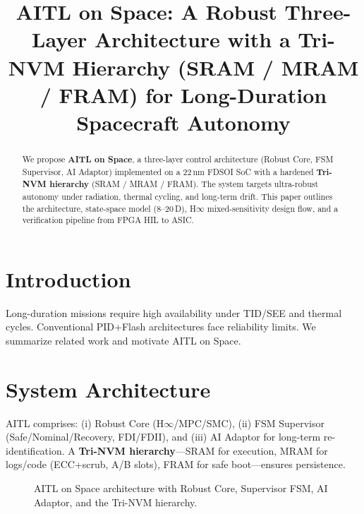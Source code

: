 \documentclass[conference]{IEEEtran}
\title{AITL on Space: A Robust Three-Layer Architecture with a Tri-NVM Hierarchy (SRAM / MRAM / FRAM) for Long-Duration Spacecraft Autonomy}
\author{%
  \IEEEauthorblockN{Shinichi Samizo}
  \IEEEauthorblockA{Independent Semiconductor Researcher\\
  Former Engineer at Seiko Epson Corporation\\
  Email: \href{mailto:shin3t72@gmail.com}{shin3t72@gmail.com}\\
  GitHub: \url{https://github.com/Samizo-AITL}}%
}
\begin{document}
\maketitle

\begin{abstract}
We propose \textbf{AITL on Space}, a three-layer control architecture (Robust Core, FSM Supervisor, AI Adaptor) implemented on a 22\,nm FDSOI SoC with a hardened \textbf{Tri-NVM hierarchy} (SRAM / MRAM / FRAM). The system targets ultra-robust autonomy under radiation, thermal cycling, and long-term drift. This paper outlines the architecture, state-space model (8--20\,D), H$\infty$ mixed-sensitivity design flow, and a verification pipeline from FPGA HIL to ASIC.
\end{abstract}

\section{Introduction}
Long-duration missions require high availability under TID/SEE and thermal cycles. Conventional PID+Flash architectures face reliability limits. We summarize related work and motivate AITL on Space.

\section{System Architecture}
AITL comprises: (i) Robust Core (H$\infty$/MPC/SMC), (ii) FSM Supervisor (Safe/Nominal/Recovery, FDI/FDII), and (iii) AI Adaptor for long-term re-identification. A \textbf{Tri-NVM hierarchy}---SRAM for execution, MRAM for logs/code (ECC+scrub, A/B slots), FRAM for safe boot---ensures persistence.

\begin{figure}[t]
  \centering
  \caption{AITL on Space architecture with Robust Core, Supervisor FSM, AI Adaptor, and the Tri-NVM hierarchy.}
  \label{fig:arch_block}
\end{figure}
\end{document}
